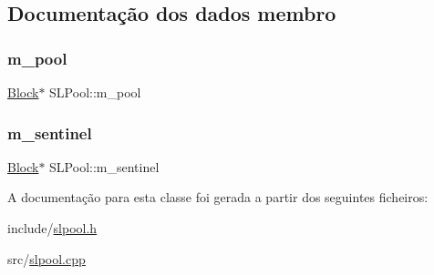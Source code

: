 \subsection{Documentação dos dados membro}
\mbox{\label{classSLPool_a7612411c05e5dd1fa06e612e7ffddca3}} 
\subsubsection{\texorpdfstring{m\+\_\+pool}{m\_pool}}
{\footnotesize\ttfamily \hyperlink{structSLPool_1_1Block}{Block}$\ast$ S\+L\+Pool\+::m\+\_\+pool\hspace{0.3cm}{\ttfamily [private]}}

\mbox{\label{classSLPool_a2c72962a10ee6bc7699602b5b79e775e}} 
\subsubsection{\texorpdfstring{m\+\_\+sentinel}{m\_sentinel}}
{\footnotesize\ttfamily \hyperlink{structSLPool_1_1Block}{Block}$\ast$ S\+L\+Pool\+::m\+\_\+sentinel\hspace{0.3cm}{\ttfamily [private]}}



A documentação para esta classe foi gerada a partir dos seguintes ficheiros\+:\begin{DoxyCompactItemize}
\item 
include/\hyperlink{slpool_8h}{slpool.\+h}\item 
src/\hyperlink{slpool_8cpp}{slpool.\+cpp}\end{DoxyCompactItemize}
